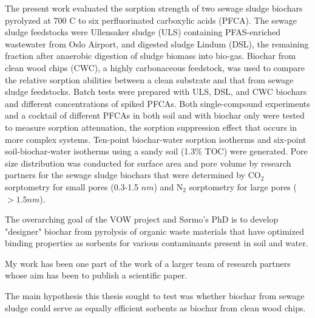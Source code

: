 The present work evaluated the sorption strength of two sewage sludge biochars pyrolyzed at 700 \textdegree C to six perfluorinated carboxylic acids (PFCA). The sewage sludge feedstocks were Ullensaker sludge (ULS) containing PFAS-enriched wastewater from Oslo Airport, and digested sludge Lindum (DSL), the remaining fraction after anaerobic digestion of sludge biomass into bio-gas. Biochar from clean wood chips (CWC), a highly carbonaceous feedstock, was used to compare the relative sorption abilities between a clean substrate and that from sewage sludge feedstocks. Batch tests were prepared with ULS, DSL, and CWC biochars and different concentrations of spiked PFCAs. Both single-compound experiments and a cocktail of different PFCAs in both soil and with biochar only were tested to measure sorption attenuation, the sorption suppression effect that occurs in more complex systems. Ten-point biochar-water sorption isotherms and six-point soil-biochar-water isotherms using a sandy soil (1.3\% TOC) were generated. Pore size distribution was conducted for surface area and pore volume by research partners for the sewage sludge biochars that were determined by $\mathrm{CO_2}$ sorptometry for small pores (0.3-1.5 $nm$) and $\mathrm{N_2}$ sorptometry for large pores ($>1.5 nm$).

The overarching goal of the VOW project and S\o rmo's PhD is to develop "designer" biochar from pyrolysis of organic waste materials that have optimized binding properties as sorbents for various contaminants present in soil and water.

My work has been one part of the work of a larger team of research partners whose aim has been to publish a scientific paper.

The main hypothesis this thesis sought to test was whether biochar from sewage sludge could serve as equally efficient sorbents as biochar from clean wood chips. 